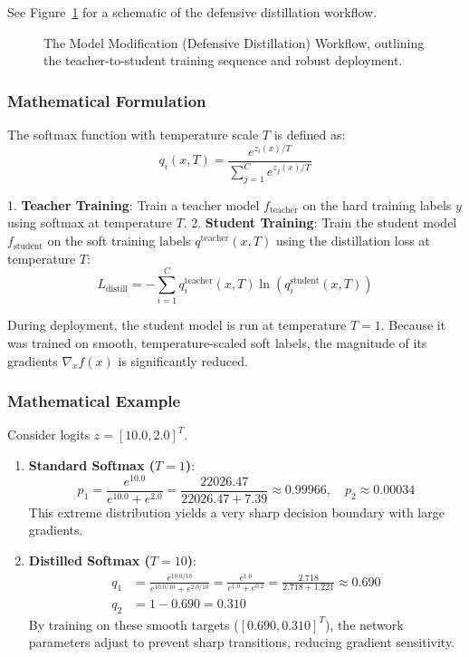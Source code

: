 \documentclass{article}
\begin{document}
See Figure~\ref{fig:model_modification} for a schematic of the defensive distillation workflow.

\begin{figure}[htbp]
    \centering
    \caption{The Model Modification (Defensive Distillation) Workflow, outlining the teacher-to-student training sequence and robust deployment.}
    \label{fig:model_modification}
\end{figure}

\subsubsection{Mathematical Formulation}
The softmax function with temperature scale $T$ is defined as:
\begin{equation}
    q_i(x, T) = \frac{e^{z_i(x) / T}}{\sum_{j=1}^C e^{z_j(x) / T}}
\end{equation}

1. \textbf{Teacher Training}: Train a teacher model $f_{\text{teacher}}$ on the hard training labels $y$ using softmax at temperature $T$.
2. \textbf{Student Training}: Train the student model $f_{\text{student}}$ on the soft training labels $q^{\text{teacher}}(x, T)$ using the distillation loss at temperature $T$:
\begin{equation}
    L_{\text{distill}} = - \sum_{i=1}^C q_i^{\text{teacher}}(x, T) \ln\left( q_i^{\text{student}}(x, T) \right)
\end{equation}

During deployment, the student model is run at temperature $T=1$. Because it was trained on smooth, temperature-scaled soft labels, the magnitude of its gradients $\nabla_x f(x)$ is significantly reduced.

\subsubsection{Mathematical Example}
Consider logits $z = [10.0, 2.0]^T$.
\begin{enumerate}
    \item \textbf{Standard Softmax ($T=1$)}:
    $$p_1 = \frac{e^{10.0}}{e^{10.0} + e^{2.0}} = \frac{22026.47}{22026.47 + 7.39} \approx 0.99966, \quad p_2 \approx 0.00034$$
    This extreme distribution yields a very sharp decision boundary with large gradients.
    
    \item \textbf{Distilled Softmax ($T=10$)}:
    \begin{align*}
        q_1 &= \frac{e^{10.0/10}}{e^{10.0/10} + e^{2.0/10}} = \frac{e^{1.0}}{e^{1.0} + e^{0.2}} = \frac{2.718}{2.718 + 1.221} \approx 0.690 \\
        q_2 &= 1 - 0.690 = 0.310
    \end{align*}
    By training on these smooth targets ($[0.690, 0.310]^T$), the network parameters adjust to prevent sharp transitions, reducing gradient sensitivity.
\end{enumerate}
\end{document}
